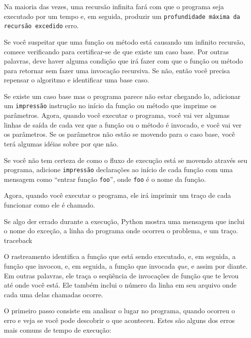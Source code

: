 \documentclass[10pt]{book}
\begin{document}
\begin{exercise}
\begin{v erbatim}

Na maioria das vezes, uma recursão infinita fará com que o programa seja executado
por um tempo e, em seguida, produzir um {\tt profundidade máxima da recursão excedido}
erro.

Se você suspeitar que uma função ou método está causando um infinito
recursão, comece verificando para certificar-se de que existe um caso base.
Por outras palavras, deve haver alguma condição que irá fazer com que o
função ou método para retornar sem fazer uma invocação recursiva.
Se não, então você precisa repensar o algoritmo e identificar uma base
caso.

Se existe um caso base mas o programa parece não estar chegando
lo, adicionar um {\tt impressão} instrução no início da função ou método
que imprime os parâmetros. Agora, quando você executar o programa, você vai ver
algumas linhas de saída de cada vez que a função ou o método é invocado,
e você vai ver os parâmetros. Se os parâmetros não estão se movendo
para o caso base, você terá algumas idéias sobre por que não.



Se você não tem certeza de como o fluxo de execução está se movendo através
seu programa, adicione {\tt impressão} declarações ao início de cada
função com uma mensagem como ``entrar função {\tt foo}'', onde
{\tt foo} é o nome da função.

Agora, quando você executar o programa, ele irá imprimir um traço de cada
funcionar como ele é chamado.



Se algo der errado durante a execução, Python
mostra uma mensagem que inclui o nome do
exceção, a linha do programa onde ocorreu o problema,
e um traço.
\index{} traceback

O rastreamento identifica a função que está sendo executado,
e, em seguida, a função que invocou, e, em seguida, a função que
invocada {\em que}, e assim por diante. Em outras palavras, ele traça o
seqüência de invocações de função que te levou até onde você está. Ele
também inclui o número da linha em seu arquivo onde cada uma delas
chamadas ocorre.

O primeiro passo consiste em analisar o lugar no programa, quando
ocorreu o erro e veja se você pode descobrir o que aconteceu.
Estes são alguns dos erros mais comuns de tempo de execução:


\end{v erbatim}
\end{exercise}
\end{document}
